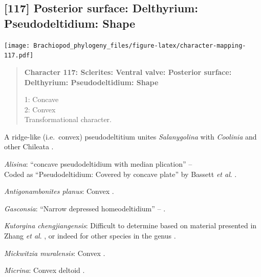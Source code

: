 \documentclass[openany]{book}
\begin{document}
\subsection*{{[}117{]} Posterior surface: Delthyrium: Pseudodeltidium:
Shape}\label{posterior-surface-delthyrium-pseudodeltidium-shape}

\texttt{[image: Brachiopod\_phylogeny\_files/figure-latex/character-mapping-117.pdf]}

\begin{quote}
\textbf{Character 117: Sclerites: Ventral valve: Posterior surface:
Delthyrium: Pseudodeltidium: Shape}

1: Concave\\
2: Convex\\
Transformational character.
\end{quote}

A ridge-like (i.e.~convex) pseudodeltitium unites \emph{Salanygolina}
with \emph{Coolinia} and other Chileata
\citep[p.~6]{Holmer2009Theenigmatic}.

\hypertarget{Alisina-coding-117}{}
\emph{Alisina}: ``concave pseudodeltidium with median plication'' --
\citet{Williams2000LinguliformeaCraniiformea}\\
Coded as ``Pseudodeltidium: Covered by concave plate'' by Bassett
\emph{et al}. \citeyearpar{Bassett2001Functionalmorphology}.

\hypertarget{Antigonambonites_planus-coding-117}{}
\emph{Antigonambonites planus}: Convex \citep[fig.
508]{Williams2000LinguliformeaCraniiformea}.

\hypertarget{Gasconsia-coding-117}{}
\emph{Gasconsia}: ``Narrow depressed homeodeltidium'' --
\citet{Hanken1985Thetaxonomy}.

\hypertarget{Kutorgina_chengjiangensis-coding-117}{}
\emph{Kutorgina chengjiangensis}: Difficult to determine based on
material presented in Zhang \emph{et al}.
\citeyearpar{Zhang2007Rhynchonelliformeanbrachiopods}, or indeed for
other species in the genus
\citep[e.g.][]{Williams2000LinguliformeaCraniiformea, Skovsted2005EarlyCambrian, Holmer2018Theattachment}.

\hypertarget{Mickwitzia_muralensis-coding-117}{}
\emph{Mickwitzia muralensis}: Convex \citep[see][fig.
4B]{Balthasar2004Shellstructure}.

\hypertarget{Micrina-coding-117}{}
\emph{Micrina}: Convex deltoid \citep{Holmer2008TheEarly}.
\end{document}
